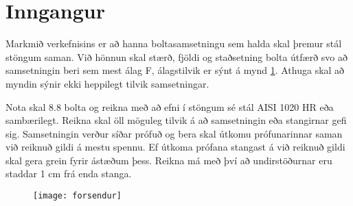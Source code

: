\documentclass[12pt, draft, isbabel]{rureport}
\begin{document}
\maketitle

\tableofcontents

\listoffixmes

\clearpage

\section{Inngangur}\label{ch::inngangur}

Markmið verkefnisins er að hanna boltasamsetningu sem halda skal þremur stál stöngum saman. 
Við hönnun skal stærð, fjöldi og staðsetning bolta útfærð svo að samsetningin beri sem mest álag F, álagstilvik er sýnt á mynd \ref{fig::forsendur}. 
Athuga skal að myndin sýnir ekki heppilegt tilvik samsetningar. 

Nota skal 8.8 bolta og reikna með að efni í stöngum sé stál AISI 1020 HR eða sambærilegt. 
Reikna skal öll möguleg tilvik á að samsetningin eða stangirnar gefi sig. Samsetningin verður síðar prófuð og bera skal útkomu prófunarinnar saman við reiknuð gildi á mestu spennu. 
Ef útkoma prófana stangast á við reiknuð gildi skal gera grein fyrir ástæðum þess. 
Reikna má með því að undirstöðurnar eru staddar 1 cm frá enda stanga.

\begin{figure}[b]
	\centering
	\texttt{[image: forsendur]}
	\caption{}
	\label{fig::forsendur}
\end{figure}





\printbibliography
\end{document}
